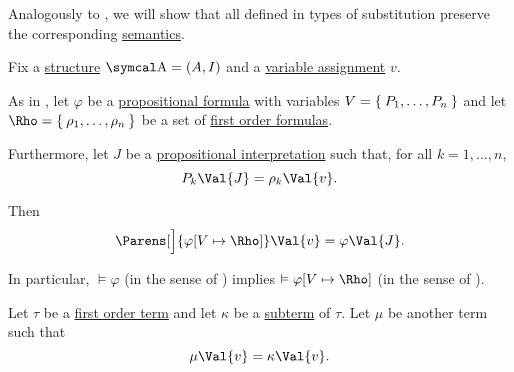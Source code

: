 \begin{proposition}\label{thm:first_order_substitution_equivalence}
  Analogously to , we will show that all defined in  types of substitution preserve the corresponding \hyperref[def:first_order_semantics]{semantics}.

  Fix a \hyperref[def:first_order_structure]{structure} \( \CA = (A, I) \) and a \hyperref[def:first_order_valuation/variable_assignment]{variable assignment} \( v \).

  \begin{PropEnum}
     As in , let \( \varphi \) be a \hyperref[def:propositional_language/formula]{propositional formula} with variables \( {V = \Set{ P_1, \ldots, P_n }} \) and let \( \Rho = \Set{ \rho_1, \ldots, \rho_n } \) be a set of \hyperref[def:first_order_language/formula]{first order formulas}.

    Furthermore, let \( J \) be a \hyperref[def:propositional_valuation/interpretation]{propositional interpretation} such that, for all \( k = 1, \ldots, n \),
    \begin{equation}\label{eq:thm:first_order_substitution_equivalence/propositional/compatibility}
      P_k\Val{J} = \rho_k\Val{v}.
    \end{equation}

    Then
    \begin{equation}\label{eq:thm:first_order_substitution_equivalence/propositional}
      \Parens[\Big]{ \varphi[V \mapsto \Rho] }\Val{v} = \varphi \Val{J}.
    \end{equation}

    In particular, \( \vDash \varphi \) (in the sense of ) implies \( \vDash \varphi[V \mapsto \Rho] \) (in the sense of ).

     Let \( \tau \) be a \hyperref[def:first_order_language/term]{first order term} and let \( \kappa \) be a \hyperref[def:first_order_language/subterm]{subterm} of \( \tau \). Let \( \mu \) be another term such that
    \begin{equation}\label{eq:thm:first_order_substitution_equivalence/term_in_term/compatibility}
      \mu\Val{v} = \kappa\Val{v}.
    \end{equation}


\end{PropEnum}
\end{proposition}
